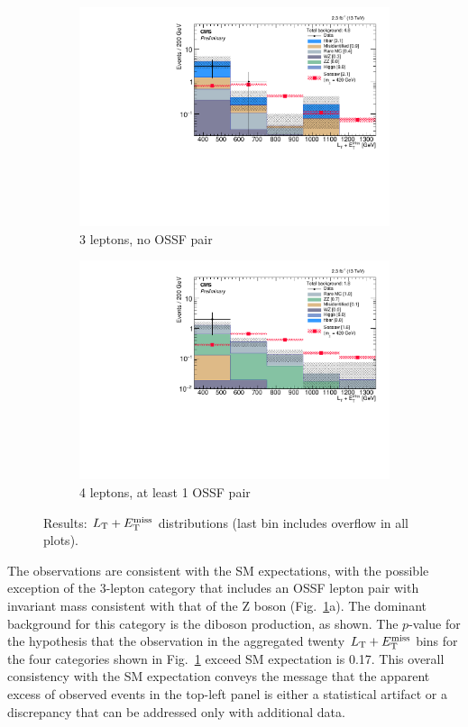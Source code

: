 \begin{figure}
\begin{center}
\begin{subfigure}[b]{.5\textwidth}
		\includegraphics[width=\textwidth]{Results/plots/L3DY0}
		\caption{3 leptons, no OSSF pair}
	\end{subfigure}%
	\begin{subfigure}[b]{.5\textwidth}
		\includegraphics[width=\textwidth]{Results/plots/L4DYgt0}
		\caption{4 leptons, at least 1 OSSF pair}
	\end{subfigure}%
	\caption{Results: $L_\textrm{T} + E_{\mathrm{T}}^{\text{miss}}$ distributions (last bin includes overflow in all plots).
	\label{fig:Results}}
\end{center}
\end{figure}

The observations are consistent with the SM expectations, with the possible exception of the 3-lepton category that includes an OSSF lepton pair with invariant mass consistent with that of the Z boson (Fig.~\ref{fig:Results}a). The dominant background for this category is the \WZ diboson production, as shown. The $p$-value for the hypothesis that the observation in the aggregated twenty $L_\textrm{T} + E_{\mathrm{T}}^{\text{miss}}$ bins for the four categories shown in Fig.~\ref{fig:Results} exceed SM expectation is 0.17. This overall consistency with the SM expectation conveys the message that the apparent excess of observed events in the top-left panel is either a statistical artifact or a discrepancy that can be addressed only with additional data.
